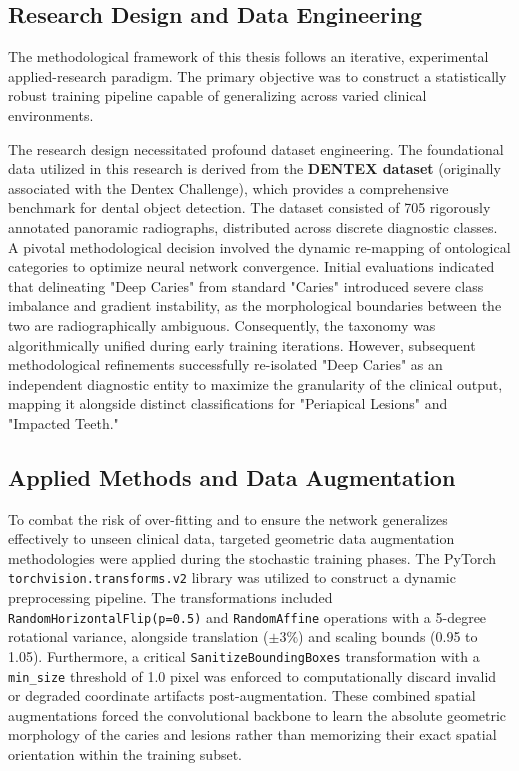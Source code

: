 \subsection{Research Design and Data Engineering}
\par The methodological framework of this thesis follows an iterative, experimental applied-research paradigm. The primary objective was to construct a statistically robust training pipeline capable of generalizing across varied clinical environments.
\par The research design necessitated profound dataset engineering. The foundational data utilized in this research is derived from the \textbf{DENTEX dataset} (originally associated with the Dentex Challenge), which provides a comprehensive benchmark for dental object detection. The dataset consisted of 705 rigorously annotated panoramic radiographs, distributed across discrete diagnostic classes. A pivotal methodological decision involved the dynamic re-mapping of ontological categories to optimize neural network convergence. Initial evaluations indicated that delineating "Deep Caries" from standard "Caries" introduced severe class imbalance and gradient instability, as the morphological boundaries between the two are radiographically ambiguous. Consequently, the taxonomy was algorithmically unified during early training iterations. However, subsequent methodological refinements successfully re-isolated "Deep Caries" as an independent diagnostic entity to maximize the granularity of the clinical output, mapping it alongside distinct classifications for "Periapical Lesions" and "Impacted Teeth."

\subsection{Applied Methods and Data Augmentation}
\par To combat the risk of over-fitting and to ensure the network generalizes effectively to unseen clinical data, targeted geometric data augmentation methodologies were applied during the stochastic training phases. The PyTorch \texttt{torchvision.transforms.v2} library was utilized to construct a dynamic preprocessing pipeline. The transformations included \texttt{RandomHorizontalFlip(p=0.5)} and \texttt{RandomAffine} operations with a 5-degree rotational variance, alongside translation (\(\pm 3\%\)) and scaling bounds (0.95 to 1.05). Furthermore, a critical \texttt{SanitizeBoundingBoxes} transformation with a \texttt{min\_size} threshold of 1.0 pixel was enforced to computationally discard invalid or degraded coordinate artifacts post-augmentation. These combined spatial augmentations forced the convolutional backbone to learn the absolute geometric morphology of the caries and lesions rather than memorizing their exact spatial orientation within the training subset.

